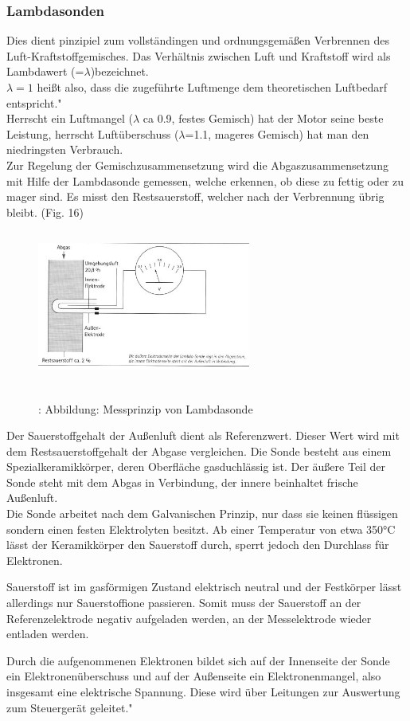 			\subsubsection{Lambdasonden}
				Dies dient pinzipiel zum vollständingen und ordnungsgemäßen Verbrennen des Luft-Kraftstoffgemisches. Das Verhältnis zwischen Luft und Kraftstoff wird als Lambdawert (=$\lambda$)bezeichnet.\\
				$\lambda = 1$ heißt also, dass die zugeführte Luftmenge dem theoretischen Luftbedarf entspricht."\cite{TS29}\\
				Herrscht ein Luftmangel ($\lambda$ ca 0.9, festes Gemisch) hat der Motor seine beste Leistung, herrscht Luftüberschuss ($\lambda$=1.1, mageres Gemisch) hat man den niedringsten Verbrauch.\\
				Zur Regelung der Gemischzusammensetzung wird die Abgaszusammensetzung mit Hilfe der Lambdasonde gemessen, welche erkennen, ob diese zu fettig oder zu mager sind. Es misst den Restsauerstoff, welcher nach der Verbrennung übrig bleibt. (Fig. 16)		
			
				\begin{figure}
					\includegraphics[width=7cm, height=5cm] {lambdasonde.png}
					\caption {\\\cite{TS30}: Abbildung: Messprinzip von Lambdasonde}
				\end{figure}
			
				\begin{flushleft}
					Der Sauerstoffgehalt der Außenluft dient als Referenzwert. Dieser Wert wird mit dem Restsauerstoffgehalt der Abgase vergleichen. Die Sonde besteht aus einem Spezialkeramikkörper, deren Oberfläche gasduchlässig ist. Der äußere Teil der Sonde steht mit dem Abgas in Verbindung, der innere beinhaltet frische Außenluft.\\
					Die Sonde arbeitet nach dem Galvanischen Prinzip, nur dass sie keinen flüssigen sondern einen festen Elektrolyten besitzt. Ab einer Temperatur von etwa 350°C lässt der Keramikkörper den Sauerstoff durch, sperrt jedoch den Durchlass für Elektronen.
					
					Sauerstoff ist im gasförmigen Zustand elektrisch neutral und der Festkörper lässt allerdings nur Sauerstoffione passieren. Somit muss der Sauerstoff an der Referenzelektrode negativ aufgeladen werden, an der Messelektrode wieder entladen werden.
					
					Durch die aufgenommenen Elektronen bildet sich auf der Innenseite der Sonde ein Elektronenüberschuss und auf der Außenseite ein Elektronenmangel, also insgesamt eine elektrische Spannung. Diese wird über Leitungen zur Auswertung zum Steuergerät geleitet."\cite{TS31}
				\end{flushleft}
			
